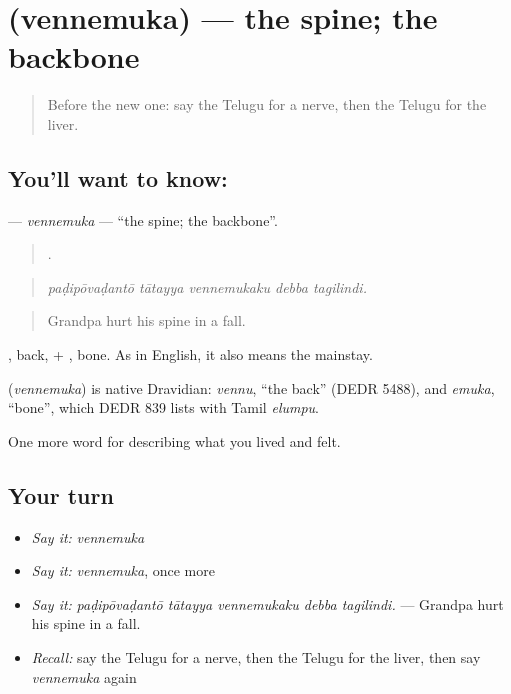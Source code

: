 \section[\texorpdfstring{\te{వెన్నెముక} (vennemuka)}{వెన్నెముక (vennemuka)}]{ (vennemuka) — the spine; the backbone}

\label{lesson:TE-C515-vennemuka}



\begin{quote}
Before the new one: say the Telugu for a nerve, then the Telugu for the liver.
\end{quote}

\subsection*{You'll want to know: }
\textbf{} — \emph{vennemuka} — \textquotedblleft{}the spine; the backbone\textquotedblright{}.

\begin{quote}
    .
\end{quote}

\begin{quote}
\emph{paḍipōvaḍantō tātayya vennemukaku debba tagilindi.}
\end{quote}

\begin{quote}
Grandpa hurt his spine in a fall.
\end{quote}

, back, + , bone. As in English, it also means the mainstay.

\begin{cousinweb}
\textbf{} (\emph{vennemuka}) is native Dravidian: \emph{vennu}, \textquotedblleft{}the back\textquotedblright{} (DEDR 5488), and \emph{emuka}, \textquotedblleft{}bone\textquotedblright{}, which DEDR 839 lists with Tamil \emph{elumpu}.
\end{cousinweb}

\begin{grammarlens}[title={What you've built}]
One more word for describing what you lived and felt.
\end{grammarlens}

\subsection*{Your turn}
\begin{itemize}
\raggedright
  \item \emph{Say it:} \emph{vennemuka}
  \item \emph{Say it:} \emph{vennemuka}, once more
  \item \emph{Say it:} \emph{paḍipōvaḍantō tātayya vennemukaku debba tagilindi.} — Grandpa hurt his spine in a fall.
  \item \emph{Recall:} say the Telugu for a nerve, then the Telugu for the liver, then say \emph{vennemuka} again
\end{itemize}

